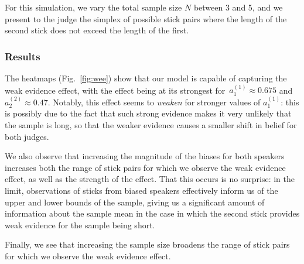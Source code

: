 \documentclass[10pt,letterpaper]{article}
\begin{document}
For this simulation, we vary the total sample size $N$ between 3 and 5, and we present to the judge the simplex of possible stick pairs 
where the length of the second stick does not exceed the length of the first.

\subsubsection{Results}
The heatmaps (Fig.~\ref{fig:wee}) show that our model is capable of capturing the weak evidence effect, with the effect being at its 
strongest for~${a_1^{(1)} \approx 0.675}$ and~${a_2^{(2)} \approx 0.47}$. Notably, this effect seems to \textit{weaken} for
stronger values of $a_1^{(1)}$: this is possibly due to the fact that such strong evidence makes it very unlikely that
the sample is long, so that the weaker evidence causes a smaller shift in belief for both judges.

We also observe that increasing the magnitude of the biases for both speakers increases both the range 
of stick pairs for which we observe the weak evidence effect, as well as the strength of the effect. That this occurs is
no surprise: in the limit, observations of sticks from biased speakers effectively inform us of the upper and lower bounds
of the sample, giving us a significant amount of information about the sample mean in the case in which the second stick
provides weak evidence for the sample being short.

Finally, we see that increasing the sample size broadens the range of stick pairs for which we observe the weak evidence
effect.
\end{document}
